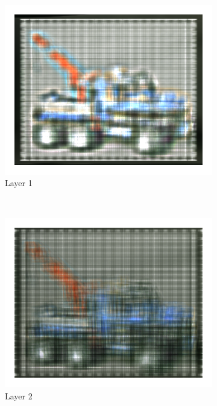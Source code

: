 \documentclass[11pt,a4paper,titlepage]{article}
\begin{document}
\newpage
\begin{figure}[h]
	\centering
	\begin{subfigure}[c]{0.3\textwidth}
 		\includegraphics[width=\textwidth]{results/legotruck_perspective_rec_3Layers_r=0/1.png}
  		\caption{Layer 1}
	\end{subfigure}%
	~
	\begin{subfigure}[c]{0.3\textwidth}
		\includegraphics[width=\textwidth]{results/legotruck_perspective_rec_3Layers_r=0/2.png}
		\caption{Layer 2}
	\end{subfigure}%
	~
	\begin{subfigure}[c]{0.3\textwidth}

\end{subfigure}
\end{figure}
\end{document}
